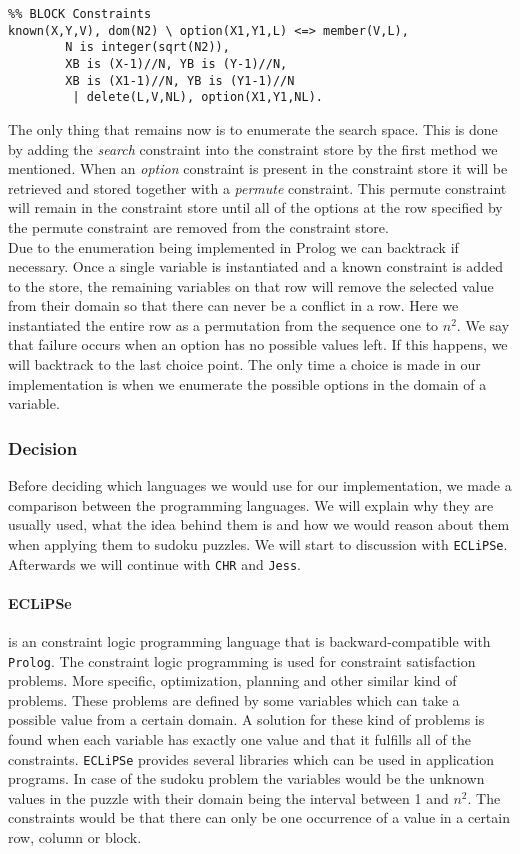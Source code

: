 \begin{lstlisting}
%% BLOCK Constraints
known(X,Y,V), dom(N2) \ option(X1,Y1,L) <=> member(V,L),
        N is integer(sqrt(N2)),
        XB is (X-1)//N, YB is (Y-1)//N,
        XB is (X1-1)//N, YB is (Y1-1)//N
         | delete(L,V,NL), option(X1,Y1,NL).
\end{lstlisting}

The only thing that remains now is to enumerate the search space. 
This is done by adding the \textsl{search} constraint into the constraint store by the first method we mentioned.
When an \textsl{option} constraint is present in the constraint store it will be retrieved and stored together with a \textsl{permute} constraint. 
This permute constraint will remain in the constraint store until all of the options at the row specified by the permute constraint are removed from the constraint store. \\

Due to the enumeration being implemented in Prolog we can backtrack if necessary.
Once a single variable is instantiated and a known constraint is added to the store, the remaining variables on that row will remove the selected value from their domain so that there can never be a conflict in a row.
Here we instantiated the entire row as a permutation from the sequence one to $n^2$. 
We say that failure occurs when an option has no possible values left.
If this happens, we will backtrack to the last choice point. 
The only time a choice is made in our implementation is when we enumerate the possible options in the domain of a variable.

\subsubsection{Decision}\label{subsec:sudokudescision}
Before deciding which languages we would use for our implementation, we made a comparison between the programming languages.
We will explain why they are usually used, what the idea behind them is and how we would reason about them when applying them to sudoku puzzles.
We will start to discussion with \texttt{ECLiPSe}. Afterwards we will continue with \texttt{CHR} and \texttt{Jess}.

\paragraph*{ECLiPSe} is an constraint logic programming language that is backward-compatible with \texttt{Prolog}.
The constraint logic programming is used for constraint satisfaction problems.
More specific, optimization, planning and other similar kind of problems.
These problems are defined by some variables which can take a possible value from a certain domain.
A solution for these kind of problems is found when each variable has exactly one value and that it fulfills all of the constraints.
\texttt{ECLiPSe} provides several libraries which can be used in application programs.
In case of the sudoku problem the variables would be the unknown values in the puzzle with their domain being the interval between 1 and $n^2$.
The constraints would be that there can only be one occurrence of a value in a certain row, column or block.

